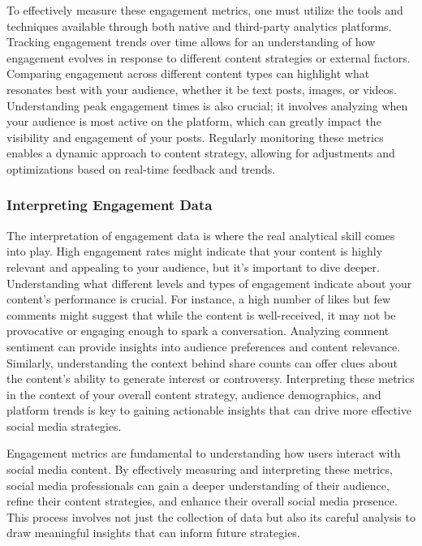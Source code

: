 \documentclass[
]{book}
\begin{document}
To effectively measure these engagement metrics, one must utilize the tools and techniques available through both native and third-party analytics platforms. Tracking engagement trends over time allows for an understanding of how engagement evolves in response to different content strategies or external factors. Comparing engagement across different content types can highlight what resonates best with your audience, whether it be text posts, images, or videos. Understanding peak engagement times is also crucial; it involves analyzing when your audience is most active on the platform, which can greatly impact the visibility and engagement of your posts. Regularly monitoring these metrics enables a dynamic approach to content strategy, allowing for adjustments and optimizations based on real-time feedback and trends.

\hypertarget{interpreting-engagement-data}{%
\subsubsection*{Interpreting Engagement Data}\label{interpreting-engagement-data}}

The interpretation of engagement data is where the real analytical skill comes into play. High engagement rates might indicate that your content is highly relevant and appealing to your audience, but it's important to dive deeper. Understanding what different levels and types of engagement indicate about your content's performance is crucial. For instance, a high number of likes but few comments might suggest that while the content is well-received, it may not be provocative or engaging enough to spark a conversation. Analyzing comment sentiment can provide insights into audience preferences and content relevance. Similarly, understanding the context behind share counts can offer clues about the content's ability to generate interest or controversy. Interpreting these metrics in the context of your overall content strategy, audience demographics, and platform trends is key to gaining actionable insights that can drive more effective social media strategies.

Engagement metrics are fundamental to understanding how users interact with social media content. By effectively measuring and interpreting these metrics, social media professionals can gain a deeper understanding of their audience, refine their content strategies, and enhance their overall social media presence. This process involves not just the collection of data but also its careful analysis to draw meaningful insights that can inform future strategies.
\end{document}
